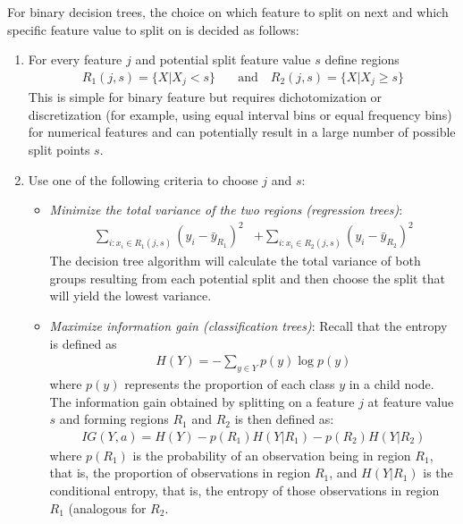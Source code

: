 For binary decision trees, the choice on which feature to split on next and which specific feature value to split on is decided as follows:
\begin{enumerate}
   \item For every feature $j$ and potential split feature value $s$ define regions
   \begin{align*}
   R_1(j,s) = \{X | X_j < s\} \quad &\text{and} \quad R_2(j, s) = \{X | X_j \geq s\}
   \end{align*}
   This is simple for binary feature but requires dichotomization or discretization (for example, using equal interval bins or equal frequency bins) for numerical features and can potentially result in a large number of possible split points $s$.
   \item Use one of the following criteria to choose $j$ and $s$:
   \begin{itemize}
      \item \emph{Minimize the total variance of the two regions (regression trees)}:
      \begin{align*}
       \sum_{i: x_i \in R_1(j,s)} (y_i - \bar{y}_{R_1})^2 &+ \sum_{i: x_i \in R_2(j,s)} (y_i - \bar{y}_{R_2})^2
       \end{align*}
       The decision tree algorithm will calculate the total variance of both groups resulting from each potential split and then choose the split that will yield the lowest variance.
      \item \emph{Maximize information gain (classification trees)}:
      Recall that the entropy is defined as 
	  \begin{align*}
	   H(Y) = - \sum_{y \in Y} p(y) \log p(y)
	   \end{align*}
       where $p(y)$ represents the proportion of each class $y$ in a child node. The information gain obtained by splitting on a feature $j$ at feature value $s$ and forming regions $R_1$ and $R_2$ is then defined as:
	   \begin{align*}
	   IG(Y, a) = H(Y) - p(R_1) H(Y | R_1) - p( R_2) H(Y | R_2) 
	   \end{align*}
       where $p(R_1)$ is the probability of an observation being in region $R_1$, that is, the proportion of observations in region $R_1$, and $H(Y | R_1)$ is the conditional entropy, that is, the entropy of those observations in region $R_1$ (analogous for $R_2$. 
       

\end{itemize}
\end{enumerate}
